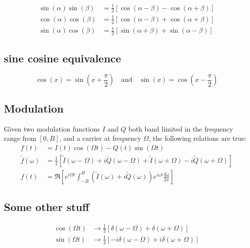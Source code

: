 \documentclass{article}
\begin{document}
\begin{align*}
  \sin(\alpha) \sin(\beta) & =
    \frac{1}{2} \left[ \cos (\alpha - \beta) - \cos(\alpha + \beta) \right] \\
  \cos(\alpha) \cos(\beta) & =
    \frac{1}{2} \left[ \cos (\alpha - \beta) + \cos(\alpha + \beta) \right]\\
  \sin(\alpha) \cos(\beta) &=
    \frac{1}{2} \left[ \sin (\alpha + \beta) + \sin(\alpha - \beta) \right]
\end{align*}

\subsection*{sine cosine equivalence}

\begin{equation*}
  \cos(x) = \sin\left(x + \frac{\pi}{2} \right)
  \quad \textrm{and} \quad
  \sin(x) = \cos\left(x - \frac{\pi}{2} \right)
\end{equation*}

\subsection*{Modulation}

Given two modulation functions $I$ and $Q$ both band limited in the frequency range from $[0, B]$, and a carrier at frequency $\Omega$, the following relations are true:
\begin{align*}
  f(t) &= I(t) \cos(\Omega t) - Q(t) \sin(\Omega t) \\
  \tilde{f}(\omega) &= \frac{1}{2} \left[
      \tilde I(\omega - \Omega) + i \tilde Q(\omega - \Omega)
    + \tilde I(\omega + \Omega) - i \tilde Q(\omega + \Omega)
    \right] \\
  f(t) &= \Re \left[
    e^{i \Omega t} \int_{-B}^B \left(
      \tilde{I}(\omega) + i \tilde{Q}(\omega)
    \right) e^{i \omega t} \frac{d \omega}{2 \pi}
  \right]
\end{align*}

\subsection{Some other stuff}

\begin{align*}
  \cos(\Omega t) &\rightarrow \frac{1}{2} \left[ \delta(\omega - \Omega) + \delta(\omega + \Omega) \right] \\
  \sin(\Omega t) &\rightarrow \frac{1}{2} \left[ -i \delta(\omega - \Omega) + i \delta(\omega + \Omega) \right]
\end{align*}
\end{document}
